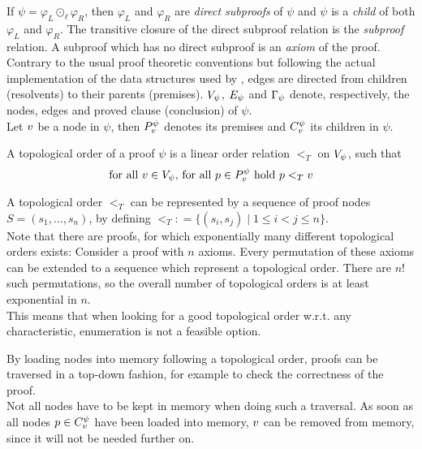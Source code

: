 \documentclass{llncs}
\newcommand{\defeq}{\mathrel{\mathop:}=}
\begin{document}
\noindent
If $\psi = \varphi_L \odot_{\ell} \varphi_R$, then $\varphi_L$ and $\varphi_R$ are \emph{direct
subproofs} of $\psi$ and $\psi$ is a \emph{child} of both $\varphi_L$ and $\varphi_R$. The
transitive closure of the direct subproof relation is the \emph{subproof} relation. A subproof which
has no direct subproof is an \emph{axiom} of the proof. 
Contrary to the usual proof
theoretic conventions but following the actual implementation of the data structures used by
\PebblingAlgorithms, edges are directed from children (resolvents) to their parents (premises).
%
$V_{\psi}$, $E_{\psi}$ and $\Gamma_{\psi}$
denote, respectively, the nodes, edges and proved clause (conclusion) of $\psi$.\\
Let $v$ be a node in $\psi$, then $P_{v}^{\psi}$ denotes its premises and $C_{v}^{\psi}$ its children in $\psi$.

\begin{definition}
\label{def:topological order}
A topological order of a proof $\psi$ is a linear order relation $<_T$ on $V_{\psi}$, such that 
$$
\text{for all } v \in V_{\psi} \text{, for all } p \in P_{v}^{\psi} \text{ hold }\\
p <_T v
$$
\end{definition}
A topological order $<_T$ can be represented by a sequence of proof nodes $S = (s_1,\dots,s_n)$, by defining $<_T \defeq \{(s_i,s_j) \mid 1 \leq i < j \leq n\}$.\\
Note that there are proofs, for which exponentially many different topological orders exists: Consider a proof with $n$ axioms. Every permutation of these axioms can be extended to a sequence which represent a topological order. There are $n!$ such permutations, so the overall number of topological orders is at least exponential in $n$.\\
This means that when looking for a good topological order w.r.t. any characteristic, enumeration is not a feasible option.

By loading nodes into memory following a topological order, proofs can be traversed in a top-down fashion, for example to check the correctness of the proof.\\
Not all nodes have to be kept in memory when doing such a traversal. As soon as all nodes $p \in C_{v}^{\psi}$ have been loaded into memory, $v$ can be removed from memory,
since it will not be needed further on.
\end{document}

